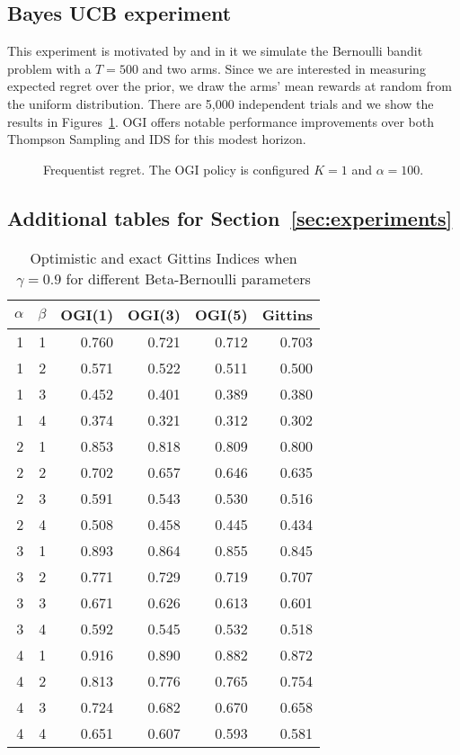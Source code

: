 \subsection{Bayes UCB experiment} \label{exp:bayes_ucb}
This experiment is motivated by \cite{kaufmann2012thompson} and in it we simulate the Bernoulli bandit problem with a $T = 500$ and two arms. Since we are interested in measuring expected regret over the prior, we draw the arms' mean rewards at random from the uniform distribution. There are 5,000 independent trials and we show the results in Figures~\ref{fig:kaufmann_regret}. OGI offers notable performance improvements over both Thompson Sampling and IDS for this modest horizon.
\begin{figure}[h!]
	\centering
	
	\caption{Frequentist regret. The OGI policy is configured $K=1$ and $\alpha=100$.}
	\label{fig:kaufmann_regret}
\end{figure}

\subsection{Additional tables for Section~\ref{sec:experiments}}
\begin{table}
	\centering
	\begin{tabular}{rrrrrr} 
		\toprule
		{}    $\alpha$ &   $\beta$ &  OGI(1) &  OGI(3) &  OGI(5) &  Gittins \\
		\midrule
		   1 & 1 &   0.760 &   0.721 &   0.712 &    0.703 \\
		   1 & 2 &   0.571 &   0.522 &   0.511 &    0.500 \\
		   1 & 3 &   0.452 &   0.401 &   0.389 &    0.380 \\
		   1 & 4 &   0.374 &   0.321 &   0.312 &    0.302 \\
		  2 & 1 &   0.853 &   0.818 &   0.809 &    0.800 \\
		  2 & 2 &   0.702 &   0.657 &   0.646 &    0.635 \\
		  2 & 3 &   0.591 &   0.543 &   0.530 &    0.516 \\
		  2 & 4 &   0.508 &   0.458 &   0.445 &    0.434 \\
		  3 & 1 &   0.893 &   0.864 &   0.855 &    0.845 \\
		  3 & 2 &   0.771 &   0.729 &   0.719 &    0.707 \\
		  3 & 3 &   0.671 &   0.626 &   0.613 &    0.601 \\
		  3 & 4 &   0.592 &   0.545 &   0.532 &    0.518 \\
		 4 & 1 &   0.916 &   0.890 &   0.882 &    0.872 \\
		  4 & 2 &   0.813 &   0.776 &   0.765 &    0.754 \\
		  4 & 3 &   0.724 &   0.682 &   0.670 &    0.658 \\
		  4 & 4 &   0.651 &   0.607 &   0.593 &    0.581 \\
		\bottomrule
	\end{tabular}
	\caption{Optimistic and exact Gittins Indices when $\gamma = 0.9$ for different Beta-Bernoulli parameters}
	\label{table:ogi_table_for_gamma_9}
\end{table}

